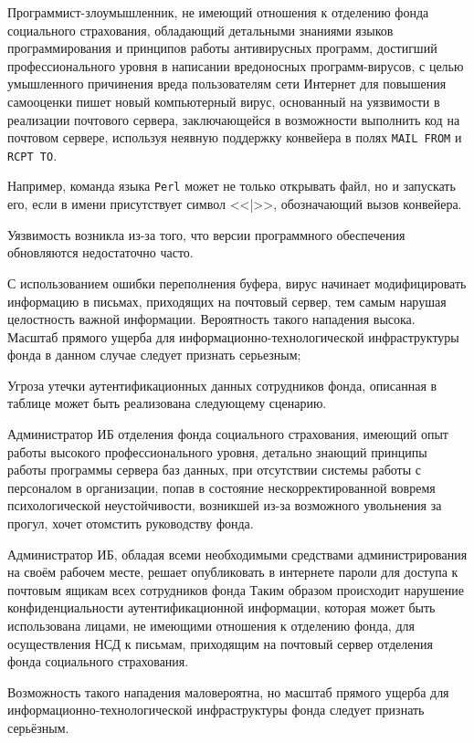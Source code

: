 \point Программист-злоумышленник, не имеющий отношения к отделению
фонда социального страхования, обладающий детальными знаниями языков
программирования и принципов работы антивирусных программ, достигший
профессионального уровня в написании вредоносных программ-вирусов, с
целью умышленного причинения вреда пользователям сети Интернет для
повышения самооценки пишет новый компьютерный вирус, основанный на
уязвимости в реализации почтового сервера, заключающейся в возможности
выполнить код на почтовом сервере, используя неявную поддержку
конвейера в полях \texttt{MAIL FROM} и \texttt{RCPT TO}.

Например, команда языка \texttt{Perl} может не только открывать файл,
но и запускать его, если в имени присутствует символ <<|>>,
обозначающий вызов конвейера.

Уязвимость возникла из-за того, что версии программного обеспечения
обновляются недостаточно часто.

С использованием ошибки переполнения буфера, вирус начинает
модифицировать информацию в письмах, приходящих на почтовый сервер,
тем самым нарушая целостность важной информации. Вероятность такого
нападения высока. Масштаб прямого ущерба для
информационно-технологической инфраструктуры фонда в данном случае
следует признать серьезным;

\point Угроза утечки аутентификационных данных сотрудников фонда,
описанная в таблице может быть реализована следующему сценарию.

\point Администратор ИБ отделения фонда социального страхования,
имеющий опыт работы высокого профессионального уровня, детально
знающий принципы работы программы сервера баз данных, при отсутствии
системы работы с персоналом в организации, попав в состояние
нескорректированной вовремя психологической неустойчивости, возникшей
из-за возможного увольнения за прогул, хочет отомстить руководству
фонда.

Администратор ИБ, обладая всеми необходимыми средствами
администрирования на своём рабочем месте, решает опубликовать в
интернете пароли для доступа к почтовым ящикам всех сотрудников фонда
Таким образом происходит нарушение конфиденциальности
аутентификационной информации, которая может быть использована лицами,
не имеющими отношения к отделению фонда, для осуществления НСД к
письмам, приходящим на почтовый сервер отделения фонда социального
страхования.

Возможность такого нападения маловероятна, но масштаб прямого ущерба
для информационно-технологической инфраструктуры фонда следует
признать серьёзным.


